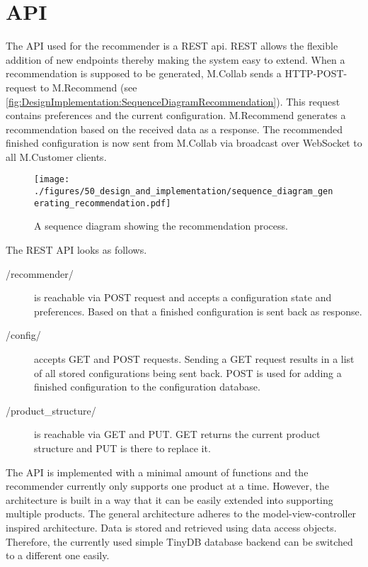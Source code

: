 \section{API}
\label{sec:DesignImplementation:API}

The API used for the recommender is a REST api. REST allows the flexible addition of new endpoints thereby making the system easy to extend.
When a recommendation is supposed to be generated, M.Collab sends a HTTP-POST-request to M.Recommend (see \autoref{fig:DesignImplementation:SequenceDiagramRecommendation}). This request contains preferences and the current configuration. M.Recommend generates a recommendation based on the received data as a response. The recommended finished configuration is now sent from  M.Collab via broadcast over WebSocket to all M.Customer clients. 

\begin{figure}
    \centering
    \texttt{[image: ./figures/50\_design\_and\_implementation/sequence\_diagram\_generating\_recommendation.pdf]}
    \caption{A sequence diagram showing the recommendation process.}
    \label{fig:DesignImplementation:SequenceDiagramRecommendation}
\end{figure}

The REST API looks as follows.

\begin{description}
    \item[/recommender/] is reachable via POST request and accepts a configuration state and preferences. Based on that a finished configuration is sent back as response.
    \item[/config/] accepts GET and POST requests. Sending a GET request results in a list of all stored configurations being sent back. POST is used for adding a finished configuration to the configuration database.
    \item[/product\_structure/] is reachable via GET and PUT. GET returns the current product structure and PUT is there to replace it.
\end{description}

The API is implemented with a minimal amount of functions and the recommender currently only supports one product at a time. However, the architecture is built in a way that it can be easily extended into supporting multiple products.
The general architecture adheres to the model-view-controller  inspired architecture.
Data is stored and retrieved using data access objects. Therefore, the currently used simple TinyDB database backend can be switched to a different one easily.

